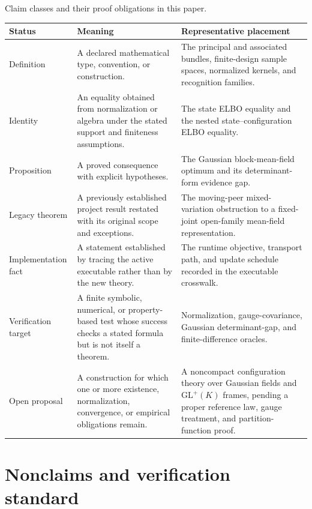 \begin{sciencetable}{Claim classes and their proof obligations in this paper.}
\label{tab:claim-taxonomy}
\begin{tabularx}{\textwidth}{>{\raggedright\arraybackslash}p{}>{\raggedright\arraybackslash}p{}>{\raggedright\arraybackslash}X}
\toprule
\textbf{Status} & \textbf{Meaning} & \textbf{Representative placement} \\
\midrule
Definition & A declared mathematical type, convention, or construction. & The principal and associated bundles, finite-design sample spaces, normalized kernels, and recognition families. \\
Identity & An equality obtained from normalization or algebra under the stated support and finiteness assumptions. & The state ELBO equality and the nested state--configuration ELBO equality. \\
Proposition & A proved consequence with explicit hypotheses. & The Gaussian block-mean-field optimum and its determinant-form evidence gap. \\
Legacy theorem & A previously established project result restated with its original scope and exceptions. & The moving-peer mixed-variation obstruction to a fixed-joint open-family mean-field representation. \\
Implementation fact & A statement established by tracing the active executable rather than by the new theory. & The runtime objective, transport path, and update schedule recorded in the executable crosswalk. \\
Verification target & A finite symbolic, numerical, or property-based test whose success checks a stated formula but is not itself a theorem. & Normalization, gauge-covariance, Gaussian determinant-gap, and finite-difference oracles. \\
Open proposal & A construction for which one or more existence, normalization, convergence, or empirical obligations remain. & A noncompact configuration theory over Gaussian fields and \(\mathrm{GL}^{+}(K)\) frames, pending a proper reference law, gauge treatment, and partition-function proof. \\
\bottomrule
\end{tabularx}
\end{sciencetable}

\section{Nonclaims and verification standard}

